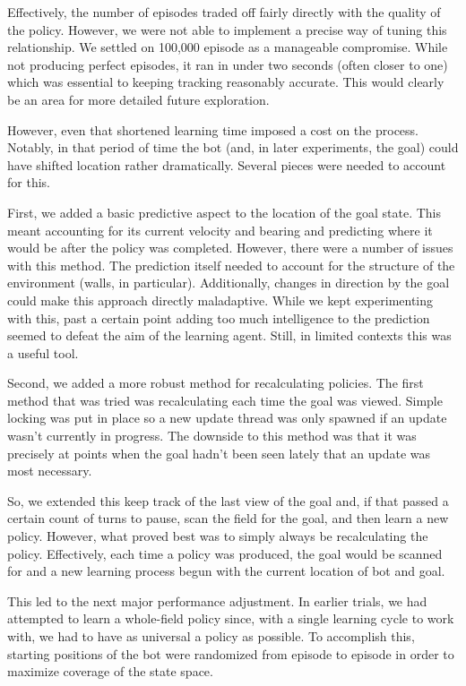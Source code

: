 \documentclass{aiaa-tc}%
\begin{document}
Effectively, the number of episodes traded off fairly directly with
the quality of the policy. However, we were not able to implement a
precise way of tuning this relationship. We settled on 100,000 episode as a manageable
compromise. While not producing perfect episodes, it ran in under two
seconds (often closer to one) which was essential to
keeping tracking reasonably accurate. This would clearly be an area
for more detailed future exploration.

However, even that shortened learning time imposed a cost on the process. Notably, in
that period of time the bot (and, in later experiments, the goal)
could have shifted location rather dramatically. Several pieces were
needed to account for this.

First, we added a basic predictive aspect to the location of the goal
state. This meant accounting for its current velocity and bearing and
predicting where it would be after the policy was completed. However,
there were a number of issues with this method. The prediction itself
needed to account for the structure of the environment (walls, in
particular). Additionally, changes in direction by the goal could make
this approach directly maladaptive. While we kept experimenting with
this, past a certain point adding too much intelligence to the
prediction seemed to defeat the aim of the learning agent. Still, in
limited contexts this was a useful tool.

Second, we added a more robust method for recalculating policies. The
first method that was tried was recalculating each time the goal
was viewed. Simple locking was put in place so a new update thread was
only spawned if an update wasn't currently in progress. The downside
to this method was that it was precisely at points when the goal
hadn't been seen lately that an update was most necessary.

So, we extended this keep track of the last view of the goal and, if
that passed a certain count of turns to pause, scan the field for the
goal, and then learn a new policy. However, what proved best was to
simply always be recalculating the policy. Effectively, each time a
policy was produced, the goal would be scanned for and a new learning
process begun with the current location of bot and goal.

This led to the next major performance adjustment. In earlier trials,
we had attempted to learn a whole-field policy since, with a single
learning cycle to work with, we had to have as universal a policy as
possible. To accomplish this, starting positions of the bot were
randomized from episode to episode in order to maximize coverage of
the state space.
\end{document}
